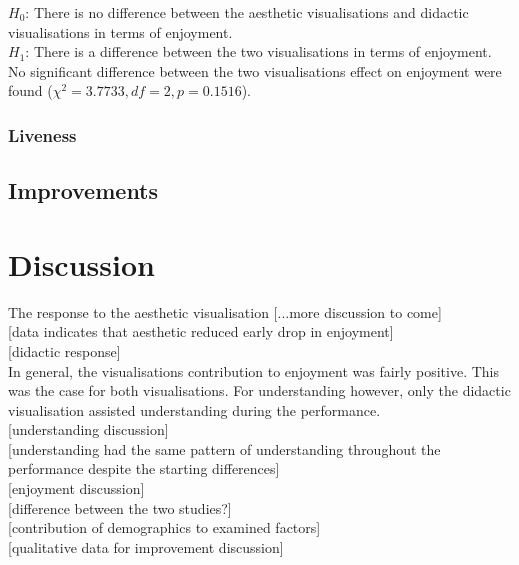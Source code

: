 \documentclass{article}
\begin{document}
$H_0$: There is no difference between the aesthetic visualisations and didactic visualisations in terms of enjoyment.\\
$H_1$: There is a difference between the two visualisations in terms of enjoyment.\\

No significant difference between the two visualisations effect on enjoyment were found ($\chi^2=3.7733,df=2,p=0.1516$).

\subsubsection{Liveness}


\subsection{Improvements}


\section{Discussion}

The response to the aesthetic visualisation [...more discussion to come]\\

[data indicates that aesthetic reduced early drop in enjoyment]\\

[didactic response]\\

In general, the visualisations contribution to enjoyment was fairly positive. This was the case for both visualisations. For understanding however, only the didactic visualisation assisted understanding during the performance.\\

[understanding discussion]\\

[understanding had the same pattern of understanding throughout the performance despite the starting differences]\\

[enjoyment discussion]\\

[difference between the two studies?]\\

[contribution of demographics to examined factors]\\

[qualitative data for improvement discussion]\\
\end{document}
